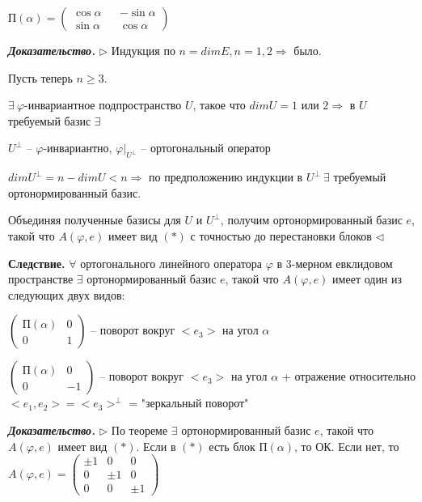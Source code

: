 $П(\alpha) = \begin{pmatrix} \cos \alpha && -\sin \alpha \\ \sin \alpha && \cos \alpha \end{pmatrix}$

\vspace{\baselineskip}
\textbf{\textit{Доказательство.}} $\rhd$ Индукция по $n = dimE, n=1, 2 \Rightarrow$ было.

Пусть теперь $n \geqslant 3$.

$\exists \ \varphi$-инвариантное подпространство $U$, такое что $dimU = 1$ или $2 \Rightarrow$ в $U$ требуемый базис $\exists$

$U^{\bot}$ -- $\varphi$-инвариантно, $\varphi|_{U^{\bot}}$ -- ортогональный оператор

$dimU^{\bot} = n - dimU < n \Rightarrow$ по предположению индукции в $U^{\bot} \ \exists$ требуемый ортонормированный базис.

Объединяя полученные базисы для $U$ и $U^{\bot}$, получим ортонормированный базис $e$, такой что $A(\varphi, e)$ имеет вид $(*)$ с точностью до перестановки блоков $\lhd$

\vspace{\baselineskip}
\textbf{Следствие.} $\forall$ ортогонального линейного оператора $\varphi$ в 3-мерном евклидовом пространстве $\exists$ ортонормированный базис $e$, такой что $A(\varphi, e)$ имеет один из следующих двух видов:

 $\begin{pmatrix} П(\alpha) & 0 \\ 0 & 1 \end{pmatrix}$ -- поворот вокруг $<e_3>$ на угол $\alpha$

 $\begin{pmatrix} П(\alpha) & 0 \\ 0 & -1 \end{pmatrix}$ -- поворот вокруг $<e_3>$ на угол $\alpha$ + отражение относительно $<e_1, e_2> = <e_3>^{\bot}$ = "зеркальный поворот"

\vspace{\baselineskip}
\textbf{\textit{Доказательство.}} $\rhd$ По теореме $\exists$ ортонормированный базис $e$, такой что $A(\varphi, e)$ имеет вид $(*)$. Если в $(*)$ есть блок $П(\alpha)$, то ОК. Если нет, то $A(\varphi, e) = \begin{pmatrix} \pm 1 & 0 & 0 \\ 0 & \pm 1 & 0 \\ 0 & 0 & \pm 1 \end{pmatrix}$


